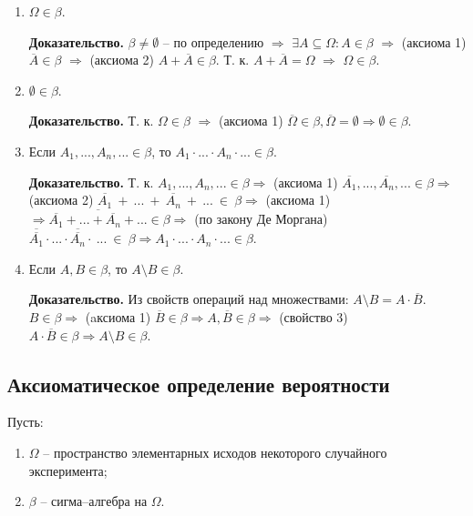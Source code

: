 \begin{enumerate}
	\item $\Omega \in \beta$.
	
	\textbf{Доказательство.} $\beta \neq \emptyset$ -- по определению $\Rightarrow$ $\exists A \subseteq \Omega: A \in \beta$ $\Rightarrow$ (аксиома 1) $\overline{A} \in \beta$ $\Rightarrow$ (аксиома 2) $A + \overline{A} \in \beta$. Т. к. $A + \overline{A} = \Omega$ $\Rightarrow$ $\Omega \in \beta$.
	
	\item $\emptyset \in \beta$.
	
	\textbf{Доказательство.} Т. к. $\Omega \in \beta$ $\Rightarrow$ (аксиома 1) $\overline{\Omega} \in \beta, \overline{\Omega} = \emptyset \Rightarrow \emptyset \in \beta$.
	
	\item Если $A_1, ..., A_n, ... \in \beta$, то $A_1 \cdot ... \cdot A_n \cdot ... \in \beta$.
	
	\textbf{Доказательство.} Т. к.  $A_1, ..., A_n, ... \in \beta \Rightarrow$ (аксиома 1) $\overline{A_1}, ...,\overline{A_n}, ... \in \beta \Rightarrow$ (аксиома 2) $\overline{A_1}~+~...~+~\overline{A_n}~+~...~\in~\beta \Rightarrow$ (аксиома 1) $\Rightarrow \overline{\overline{A_1} + ... +\overline{A_n} + ...} \in \beta \Rightarrow$ (по закону Де Моргана) $\overline{\overline{A_1}} \cdot ... \cdot \overline{\overline{A_n}} \cdot~...~\in~\beta \Rightarrow A_1 \cdot ... \cdot A_n \cdot ... \in \beta$.
	
	\item Если $A, B \in \beta$, то $A \setminus B \in \beta$.
	
	\textbf{Доказательство.} Из свойств операций над множествами: $A \setminus B = A \cdot \overline{B}$. $B \in \beta \Rightarrow$ (aксиома 1) $\overline{B} \in \beta \Rightarrow A, \overline{B} \in \beta \Rightarrow$ (свойство 3) $A \cdot \overline{B} \in \beta \Rightarrow A \setminus B \in \beta$.
\end{enumerate}

\subsection*{Аксиоматическое определение вероятности}

Пусть:
\begin{enumerate}[label=\arabic*)]
	\item $\Omega$ -- пространство элементарных исходов некоторого случайного эксперимента;
	\item $\beta$ -- сигма--алгебра на $\Omega$.
\end{enumerate}

